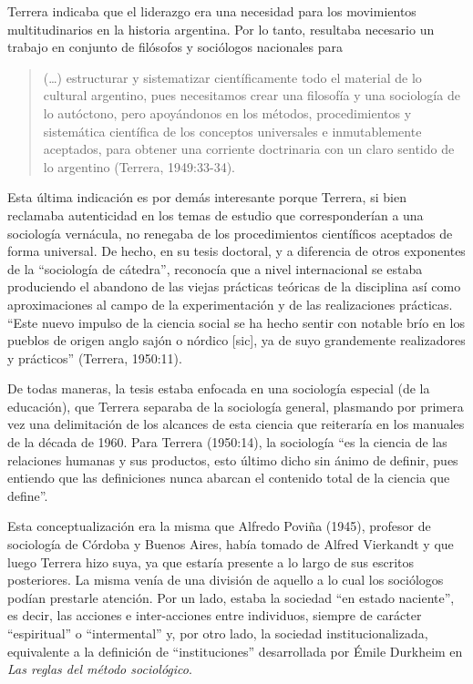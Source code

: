Terrera indicaba que el liderazgo era una necesidad para los movimientos multitudinarios en la historia argentina. Por lo tanto, resultaba necesario un trabajo en conjunto de filósofos y sociólogos nacionales para

\begin{quote}
(\ldots) estructurar y sistematizar científicamente todo el material de lo cultural argentino, pues necesitamos crear una filosofía y una sociología de lo autóctono, pero apoyándonos en los métodos, procedimientos y sistemática científica de los conceptos universales e inmutablemente aceptados, para obtener una corriente doctrinaria con un claro sentido de lo argentino (Terrera, 1949:33-34).
\end{quote}

Esta última indicación es por demás interesante porque Terrera, si bien reclamaba autenticidad en los temas de estudio que corresponderían a una sociología vernácula, no renegaba de los procedimientos científicos aceptados de forma universal. De hecho, en su tesis doctoral, y a diferencia de otros exponentes de la ``sociología de cátedra'', reconocía que a nivel internacional se estaba produciendo el abandono de las viejas prácticas teóricas de la disciplina así como aproximaciones al campo de la experimentación y de las realizaciones prácticas. ``Este nuevo impulso de la ciencia social se ha hecho sentir con notable brío en los pueblos de origen anglo sajón o nórdico {[}sic{]}, ya de suyo grandemente realizadores y prácticos'' (Terrera, 1950:11).

De todas maneras, la tesis estaba enfocada en una sociología especial (de la educación), que Terrera separaba de la sociología general, plasmando por primera vez una delimitación de los alcances de esta ciencia que reiteraría en los manuales de la década de 1960. Para Terrera (1950:14), la sociología ``es la ciencia de las relaciones humanas y sus productos, esto último dicho sin ánimo de definir, pues entiendo que las definiciones nunca abarcan el contenido total de la ciencia que define''.

Esta conceptualización era la misma que Alfredo Poviña (1945), profesor de sociología de Córdoba y Buenos Aires, había tomado de Alfred Vierkandt y que luego Terrera hizo suya, ya que estaría presente a lo largo de sus escritos posteriores. La misma venía de una división de aquello a lo cual los sociólogos podían prestarle atención. Por un lado, estaba la sociedad ``en estado naciente'', es decir, las acciones e inter-acciones entre individuos, siempre de carácter ``espiritual'' o ``intermental'' y, por otro lado, la sociedad institucionalizada, equivalente a la definición de ``instituciones'' desarrollada por Émile Durkheim en \emph{Las reglas del método sociológico}.

